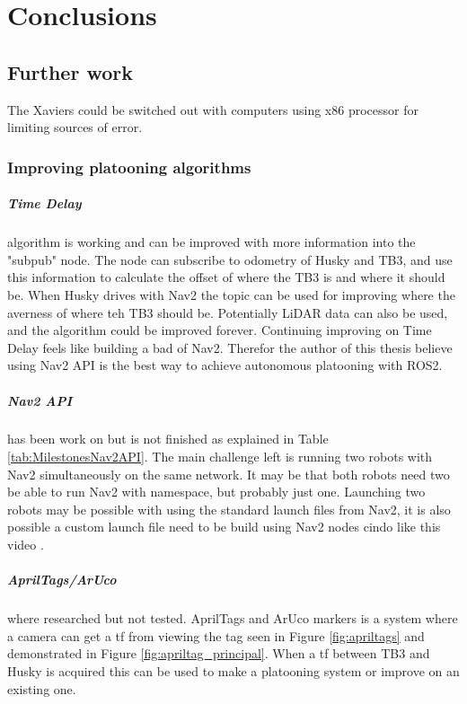 \chapter{Conclusions}

\section{Further work}
The Xaviers could be switched out with computers using x86 processor for limiting sources of error. 

\subsection{Improving platooning algorithms}
\paragraph{Time Delay} algorithm is working and can be improved with more information into the "subpub" node. The node can subscribe to odometry of Husky and TB3, and use this information to calculate the offset of where the TB3 is and where it should be. When Husky drives with Nav2 the topic  can be used for improving where the averness of where teh TB3 should be. Potentially LiDAR data can also be used, and the algorithm could be improved forever. Continuing improving on Time Delay feels like building a bad of Nav2. Therefor the author of this thesis believe using Nav2 API is the best way to achieve autonomous platooning with ROS2. 

\paragraph{Nav2 API} has been work on but is not finished as explained in Table \ref{tab:MilestonesNav2API}. The main challenge left is running two robots with Nav2 simultaneously on the same network. It may be that both robots need two be able to run Nav2 with namespace, but probably just one. Launching two robots may be possible with using the standard launch files from Nav2, it is also possible a custom launch file need to be build using Nav2 nodes cindo like this video \cite{MultiRobotNav2}.

\paragraph{AprilTags/ArUco} where researched but not tested. AprilTags and ArUco markers is a system where a camera can get a tf from viewing the tag seen in Figure \ref{fig:apriltags} and demonstrated in Figure \ref{fig:apriltag_principal}. When a tf between TB3 and Husky is acquired this can be used to make a platooning system or improve on an existing one. 

